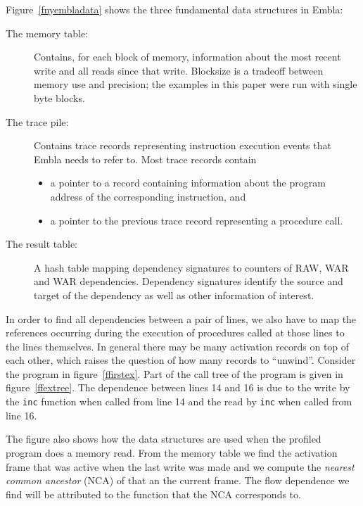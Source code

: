 Figure~\ref{fnyembladata} shows the three fundamental data structures 
in Embla:
\begin{description}
\item[The memory table:]
Contains, for each block of memory, information about the most 
recent write and all reads since that write. 
Blocksize is a tradeoff between memory use and precision; the examples in 
this paper were run with single byte blocks. 
\item[The trace pile:]
Contains trace records representing instruction execution events that 
Embla needs to refer to. Most trace records contain 
\begin{itemize}
\item
a pointer to a record containing information about the program 
address of the corresponding instruction, and
\item
a pointer to the previous trace record representing a procedure call.
\end{itemize}
\item[The result table:]
A hash table mapping dependency signatures to counters of RAW, WAR 
and WAR dependencies. Dependency signatures identify the source and
target of the dependency as well as other information of interest.
\end{description}
In order to find all dependencies between a pair of lines, we also have
to map the references occurring during the execution of procedures 
called at those lines to the lines themselves. In general there may be 
many activation records on top of each other, which raises the question 
of how many records to ``unwind''. Consider the program in 
figure~\ref{ffirstex}. Part of the call tree of the program is given 
in figure~\ref{ffextree}. The dependence between lines 14 and 16 is due to
the write by the {\tt inc} function when called from line 14 and the
read by {\tt inc} when called from line 16. 








The figure also shows how the data structures are used when the
profiled program does a memory read. From the memory table we find the
activation frame that was active when the last write was made and we
compute the {\em nearest common ancestor} (NCA) of that an the
current frame. The flow dependence we find will be attributed to the
function that the NCA corresponds to. 

